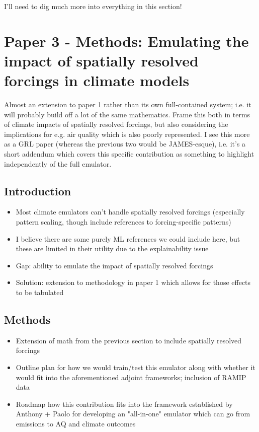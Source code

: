I'll need to dig much more into everything in this section!

\clearpage

\section{Paper 3 - Methods: Emulating the impact of spatially resolved forcings in climate models}\label{sec:paper3}

Almost an extension to paper 1 rather than its own full-contained system; i.e. it will probably build off a lot of the same mathematics. Frame this both in terms of climate impacts of spatially resolved forcings, but also considering the implications for e.g. air quality which is also poorly represented. I see this more as a GRL paper (whereas the previous two would be JAMES-esque), i.e. it's a short addendum which covers this specific contribution as something to highlight independently of the full emulator.

\subsection{Introduction}

\begin{itemize}
  \item Most climate emulators can't handle spatially resolved forcings (especially pattern scaling, though include references to forcing-specific patterns)
  \item I believe there are some purely ML references we could include here, but these are limited in their utility due to the explainability issue
\end{itemize}

\begin{itemize}
  \item Gap: ability to emulate the impact of spatially resolved forcings
  \item Solution: extension to methodology in paper 1 which allows for those effects to be tabulated
\end{itemize}

\subsection{Methods}

\begin{itemize}
  \item Extension of math from the previous section to include spatially resolved forcings
  \item Outline plan for how we would train/test this emulator along with whether it would fit into the aforementioned adjoint frameworks; inclusion of RAMIP data
  \item Roadmap how this contribution fits into the framework established by Anthony + Paolo for developing an "all-in-one" emulator which can go from emissions to AQ and climate outcomes
\end{itemize}

